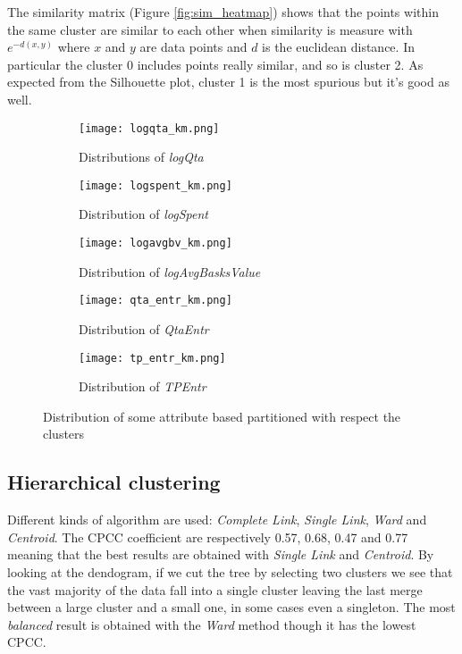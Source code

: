 \documentclass{article}
\begin{document}
The similarity matrix (Figure \ref{fig:sim_heatmap}) shows that the points within the same cluster are similar to each other when similarity is measure with $e^{-d(x, y)}$ where $x$ and $y$ are data points and $d$ is the euclidean distance. In particular the cluster 0 includes points really similar, and so is cluster 2. As expected from the Silhouette plot, cluster 1 is the most spurious but it's good as well.

\begin{figure}[h!]
    \centering
    \begin{subfigure}{0.49\textwidth}
        \texttt{[image: logqta\_km.png]}
        \caption{Distributions of \emph{logQta}}
        \label{fig:logqta}
    \end{subfigure}
    \begin{subfigure}{0.49\textwidth}
        \centering
        \texttt{[image: logspent\_km.png]}
        \caption{Distribution of \emph{logSpent}}
        \label{fig:logspent}

    \end{subfigure}
        \begin{subfigure}{0.49\textwidth}
        \centering
        \texttt{[image: logavgbv\_km.png]}
        \caption{Distribution of \emph{logAvgBasksValue}}
        \label{fig:logavgbv}
    \end{subfigure}
        \begin{subfigure}{0.49\textwidth}
        \centering
        \texttt{[image: qta\_entr\_km.png]}
        \caption{Distribution of \emph{QtaEntr}}
        \label{fig:qtaentr}

    \end{subfigure}
        \begin{subfigure}{0.49\textwidth}
        \centering
        \texttt{[image: tp\_entr\_km.png]}
        \caption{Distribution of \emph{TPEntr}}
        \label{fig:tpentr}
    \end{subfigure}
    \caption{Distribution of some attribute based partitioned with respect the clusters}
\end{figure}
\newpage
\subsection{Hierarchical clustering}
Different kinds of algorithm are used: \emph{Complete Link}, \emph{Single Link}, \emph{Ward} and \emph{Centroid}. The CPCC coefficient are respectively 0.57, 0.68, 0.47 and 0.77 meaning that the best results are obtained with \emph{Single Link} and \emph{Centroid}. By looking at the dendogram, if we cut the tree by selecting two clusters we see that the vast majority of the data fall into a single cluster leaving the last merge between a large cluster and a small one, in some cases even a singleton. The most \emph{balanced} result is obtained with the \emph{Ward} method though it has the lowest CPCC.
\end{document}
